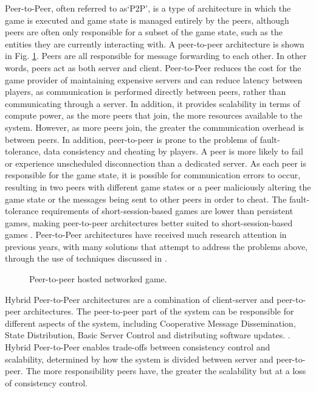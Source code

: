 Peer-to-Peer, often referred to as`P2P', is a type of architecture in which the game is executed and game state is managed entirely by the peers, although peers are often only responsible for a subset of the game state, such as the entities they are currently interacting with. A peer-to-peer architecture is shown in Fig. \ref{fig_P2P}. Peers are all responsible for message forwarding to each other. In other words, peers act as both server and client. Peer-to-Peer reduces the cost for the game provider of maintaining expensive servers and can reduce latency between players, as communication is performed directly between peers, rather than communicating through a server. In addition, it provides scalability in terms of compute power, as the more peers that join, the more resources available to the system. However, as more peers join, the greater the communication overhead is between peers. In addition, peer-to-peer is prone to the problems of fault-tolerance, data consistency and cheating by players. A peer is more likely to fail or experience unscheduled disconnection than a dedicated server. As each peer is responsible for the game state, it is possible for communication errors to occur, resulting in two peers with different game states or a peer maliciously altering the game state or the messages being sent to other peers in order to cheat. The fault-tolerance requirements of short-session-based games are lower than persistent games, making peer-to-peer architectures better suited to short-session-based games \cite{P2PForMMOs}. Peer-to-Peer architectures have received much research attention in previous years, with many solutions that attempt to address the problems above, through the use of techniques discussed in \cite{P2PForMMOs}.


\begin{figure}
	\centering
	
	\caption{Peer-to-peer hosted networked game.}
	\label{fig_P2P}
\end{figure}

Hybrid Peer-to-Peer architectures are a combination of client-server and peer-to-peer architectures. The peer-to-peer part of the system can be responsible for different aspects of the system, including Cooperative Message Dissemination, State Distribution, Basic Server Control and distributing software updates. \cite{P2PForMMOs}. Hybrid Peer-to-Peer enables trade-offs between consistency control and scalability, determined by how the system is divided between server and peer-to-peer. The more responsibility peers have, the greater the scalability but at a loss of consistency control.

